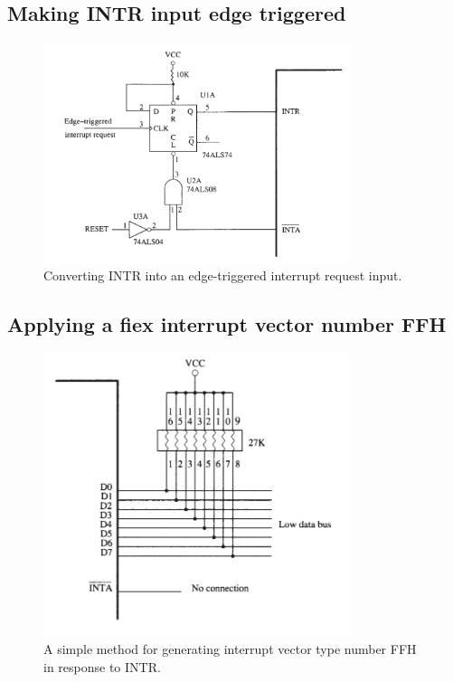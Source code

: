 \subsection{Making INTR input edge triggered}
\begin{figure}[h!]
  \includegraphics[width = 0.8\textwidth]{./figures/INTR_Edge.png}
  \caption{Converting INTR into an edge-triggered interrupt request input.}
\end{figure}

\subsection{Applying a fiex interrupt vector number FFH}
\begin{figure}[h!]
  \includegraphics[width = 0.8\textwidth]{./figures/INTR_FFH.png}
  \caption{A simple method for generating interrupt vector type number FFH in response to INTR.}
\end{figure}

